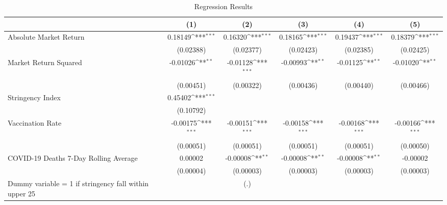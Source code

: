 \begin{table}[htbp]\centering
\def\sym#1{\ifmmode^{#1}\else\(^{#1}\)\fi}
\caption{Regression Results \label{reg1}}
\begin{tabular}{l*{5}{c}}
\toprule
                    &\multicolumn{1}{c}{(1)}         &\multicolumn{1}{c}{(2)}         &\multicolumn{1}{c}{(3)}         &\multicolumn{1}{c}{(4)}         &\multicolumn{1}{c}{(5)}         \\
\midrule
Absolute Market Return&     0.18149\sym{***}&     0.16320\sym{***}&     0.18165\sym{***}&     0.19437\sym{***}&     0.18379\sym{***}\\
                    &   (0.02388)         &   (0.02377)         &   (0.02423)         &   (0.02385)         &   (0.02425)         \\
\addlinespace
Market Return Squared&    -0.01026\sym{**} &    -0.01128\sym{***}&    -0.00993\sym{**} &    -0.01125\sym{**} &    -0.01020\sym{**} \\
                    &   (0.00451)         &   (0.00322)         &   (0.00436)         &   (0.00440)         &   (0.00466)         \\
\addlinespace
Stringency Index    &     0.45402\sym{***}&                     &                     &                     &                     \\
                    &   (0.10792)         &                     &                     &                     &                     \\
\addlinespace
Vaccination Rate    &    -0.00175\sym{***}&    -0.00151\sym{***}&    -0.00158\sym{***}&    -0.00168\sym{***}&    -0.00166\sym{***}\\
                    &   (0.00051)         &   (0.00051)         &   (0.00051)         &   (0.00051)         &   (0.00050)         \\
\addlinespace
COVID-19 Deaths 7-Day Rolling Average&     0.00002         &    -0.00008\sym{**} &    -0.00008\sym{**} &    -0.00008\sym{**} &    -0.00002         \\
                    &   (0.00004)         &   (0.00003)         &   (0.00003)         &   (0.00003)         &   (0.00003)         \\
\addlinespace
Dummy variable = 1 if stringency fall within upper 25%
                    &                     &         (.)         &                     &                     &                     \\

\end{tabular}
\end{table}
